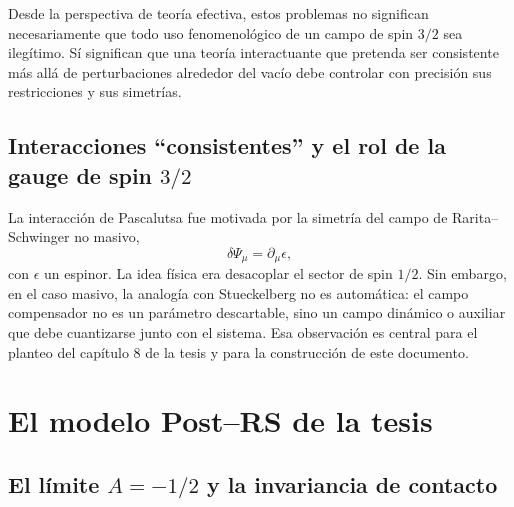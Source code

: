 \documentclass[11pt,a4paper]{article}
\numberwithin{equation}{section}
\begin{document}
Desde la perspectiva de teoría efectiva, estos problemas no significan necesariamente que todo uso fenomenológico de un campo de spin $3/2$ sea ilegítimo. Sí significan que una teoría interactuante que pretenda ser consistente más allá de perturbaciones alrededor del vacío debe controlar con precisión sus restricciones y sus simetrías.

\subsection{Interacciones ``consistentes'' y el rol de la gauge de spin \texorpdfstring{$3/2$}{3/2}}
\label{subsec:interacciones-consistentes-y-el-rol-de-la-gauge-de}

La interacción de Pascalutsa fue motivada por la simetría del campo de Rarita--Schwinger no masivo,
\begin{equation}
\delta\Psi_\mu=\partial_\mu\epsilon,
\end{equation}
con $\epsilon$ un espinor. La idea física era desacoplar el sector de spin $1/2$. Sin embargo, en el caso masivo, la analogía con Stueckelberg no es automática: el campo compensador no es un parámetro descartable, sino un campo dinámico o auxiliar que debe cuantizarse junto con el sistema. Esa observación es central para el planteo del capítulo 8 de la tesis y para la construcción de este documento.

\section{El modelo Post--RS de la tesis}
\label{sec:el-modelo-post-rs-de-la-tesis}

\subsection{El límite \texorpdfstring{$A=-1/2$}{A=-1/2} y la invariancia de contacto}
\label{subsec:el-limite-a-1-2-y-la-invariancia-de-contacto}
\end{document}
